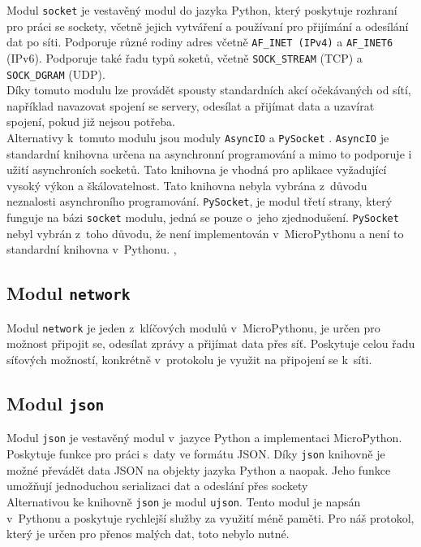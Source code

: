 \documentclass[12pt]{report}			%
\begin{document}
Modul \texttt{socket} je vestavěný modul do jazyka Python, který poskytuje rozhraní pro práci se sockety, včetně jejich vytváření a používaní pro přijímání a odesílání dat po síti. Podporuje různé rodiny adres včetně \texttt{AF\_INET (IPv4)} a \texttt{AF\_INET6} (IPv6). Podporuje také řadu typů soketů, včetně \texttt{SOCK\_STREAM} (TCP) a \texttt{SOCK\_DGRAM} (UDP). \cite{socket}
\\
Díky tomuto modulu lze provádět spousty standardních akcí očekávaných od sítí, například navazovat spojení se servery, odesílat a přijímat data a uzavírat spojení, pokud již nejsou potřeba. 
\\
Alternativy k~tomuto modulu jsou moduly 
\texttt{AsyncIO} a 
\texttt{PySocket}
. \texttt{AsyncIO} je standardní knihovna určena na asynchronní programování a mimo to podporuje i užití asynchroních socketů. Tato knihovna je vhodná pro aplikace vyžadující vysoký výkon a škálovatelnost. Tato knihovna nebyla vybrána z~důvodu neznalosti asynchroního programování. \texttt{PySocket}, je modul třetí strany, který funguje na bázi \texttt{socket} modulu, jedná se pouze o~jeho zjednodušení. \texttt{PySocket} nebyl vybrán z~toho důvodu, že není implementován v~MicroPythonu a není to standardní knihovna v~Pythonu. \cite{async}, \cite{pysocket}

\subsection{Modul \texttt{network}}

Modul \texttt{network} je jeden z~klíčových modulů v~MicroPythonu, je určen pro možnost připojit se, odesílat zprávy a přijímat data přes síť. Poskytuje celou řadu síťových možností, konkrétně v~protokolu je využit na připojení se k~síti. \cite{network}

\subsection{Modul \texttt{json}}
Modul \texttt{json} je vestavěný modul v~jazyce Python a  implementaci MicroPython. Poskytuje funkce pro práci s~daty ve formátu JSON. Díky \texttt{json} knihovně je možné převádět data JSON na objekty jazyka Python a naopak. Jeho funkce umožňují jednoduchou serializaci dat a odeslání přes sockety \cite{json}
\\
Alternativou ke knihovně \texttt{json} je modul \texttt{ujson}. Tento modul je napsán v~Pythonu a poskytuje rychlejší služby za využití méně paměti. Pro náš protokol, který je určen pro přenos malých dat, toto nebylo nutné. \cite{ujson}
\end{document}
